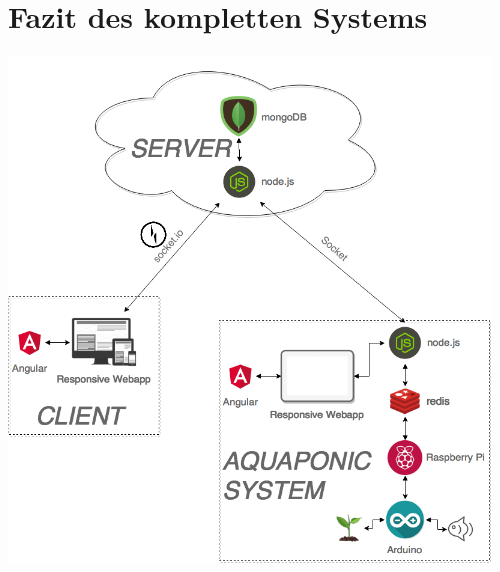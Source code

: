 \documentclass[11pt]{article}
\begin{document}
\section{Fazit des kompletten Systems}
\includegraphics[height=5.3in]{complete_system}
\end{document}
